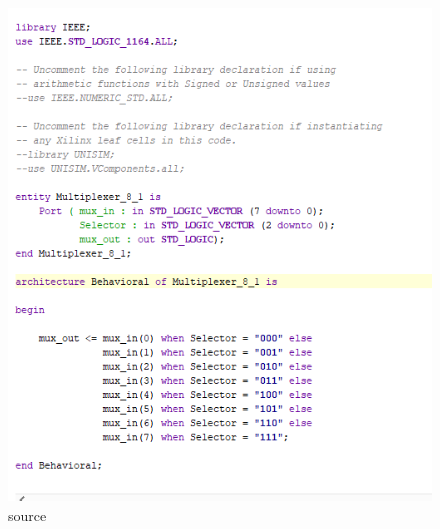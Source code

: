 \documentclass{article}
\begin{document}
\begin{figure}[h]
\begin{center}
\includegraphics[width=1\textwidth]{MultiplexerSource.png} %
\caption{source}
\end{center}
\end{figure}
\end{document}
